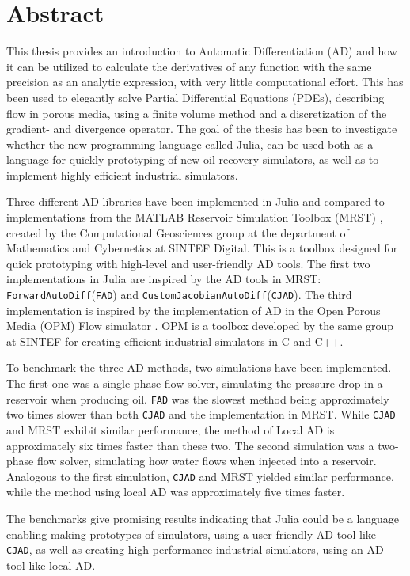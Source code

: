\chapter*{Abstract}
This thesis provides an introduction to Automatic Differentiation (AD) and how it can be utilized to calculate the derivatives of any function with the same precision as an analytic expression, with very little computational effort. This has been used to elegantly solve Partial Differential Equations (PDEs), describing flow in porous media, using a finite volume method and a discretization of the gradient- and divergence operator. The goal of the thesis has been to investigate whether the new programming language called Julia, can be used both as a language for quickly prototyping of new oil recovery simulators, as well as to implement highly efficient industrial simulators.

Three different AD libraries have been implemented in Julia and compared to implementations from the MATLAB Reservoir Simulation Toolbox (MRST) \emph{\citep{mrstHomepage}}, created by the Computational Geosciences  group  at  the  department  of  Mathematics  and  Cybernetics  at  SINTEF Digital. This is a toolbox designed for quick prototyping with high-level and user-friendly AD tools. The first two implementations in Julia are inspired by the AD tools in MRST: \texttt{ForwardAutoDiff}(\texttt{FAD}) and \texttt{CustomJacobianAutoDiff}(\texttt{CJAD}). The third implementation is inspired by the implementation of AD in the Open Porous Media (OPM) Flow simulator \emph{\citep{opm}}. OPM is a toolbox developed by the same group at SINTEF for creating efficient industrial simulators in C and C++. 

To benchmark the three AD methods, two simulations have been implemented. The first one was a single-phase flow solver, simulating the pressure drop in a reservoir when producing oil. \texttt{FAD} was the slowest method being approximately two times slower than both \texttt{CJAD} and the implementation in MRST. While \texttt{CJAD} and MRST exhibit similar performance, the method of Local AD is approximately six times faster than these two. The second simulation was a two-phase flow solver, simulating how water flows when injected into a reservoir. Analogous to the first simulation, \texttt{CJAD} and MRST yielded similar performance, while the method using local AD was approximately five times faster.

The benchmarks give promising results indicating that Julia could be a language enabling making prototypes of simulators, using a user-friendly AD tool like \texttt{CJAD}, as well as creating high performance industrial simulators, using an AD tool like local AD.